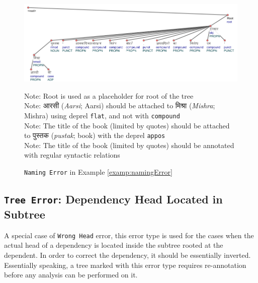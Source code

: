 \begin{figure}[H]
    \centering
    \includegraphics[scale=0.60]{img/namingError.png}
    \caption{\texttt{Naming Error} in Example \ref{examp:namingError}}
    Note: Root is used as a placeholder for root of the tree\\
    Note: \texthindi{आरसी} (\textit{Aarsi}; Aarsi) should be attached to \texthindi{मिश्रा} (\textit{Mishra}; Mishra) using deprel \texttt{flat}, and not with \texttt{compound}\\
    Note: The title of the book (limited by quotes) should be attached to \texthindi{पुस्तक} (\textit{pustak}; book) with the deprel \texttt{appos}\\
    Note: The title of the book (limited by quotes) should be annotated with regular syntactic relations
    \label{examp:namingError-fig}
\end{figure}

\subsection[Dependency Head Located in Subtree: \texttt{Tree Error}]{\texttt{Tree Error}: Dependency Head Located in Subtree}

A special case of \texttt{Wrong Head} error, this error type is used for the cases when the actual head of a dependency is located inside the subtree rooted at the dependent. In order to correct the dependency, it should be essentially inverted. Essentially speaking, a tree marked with this error type requires re-annotation before any analysis can be performed on it.

